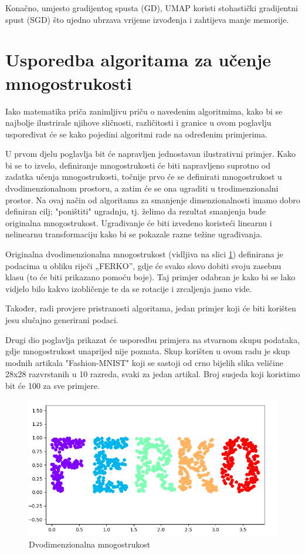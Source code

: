 \documentclass[times, utf8, diplomski]{fer}
\begin{document}
Konačno, umjesto gradijentog spusta (GD), UMAP koristi stohastički gradijentni spust (SGD) što ujedno ubrzava vrijeme izvođenja i zahtijeva manje memorije.

\section{Usporedba algoritama za učenje mnogostrukosti}

Iako matematika priča zanimljivu priču o navedenim algoritmima, kako bi se najbolje ilustrirale njihove sličnosti, različitosti i granice u ovom poglavlju uspoređivat će se kako pojedini algoritmi rade na određenim primjerima.

U prvom djelu poglavlja bit će napravljen jednostavan ilustrativni primjer. Kako bi se to izvelo, definiranje mnogostrukosti će biti napravljeno suprotno od zadatka učenja mnogostrukosti, točnije prvo će se definirati mnogostrukost u dvodimenzionalnom prostoru, a zatim će se ona ugraditi u trodimenzionalni prostor. Na ovaj način od algoritama za smanjenje dimenzionalnosti imamo dobro definiran cilj; "poništiti" ugradnju, tj. želimo da rezultat smanjenja bude originalna mnogostrukost. Ugrađivanje će biti izvedeno koristeći linearnu i nelinearnu transformaciju kako bi se pokazale razne težine ugrađivanja.

Originalna dvodimenzionalna mnogostrukost (vidljiva na slici \ref{fig:ferko}) definirana je podacima u obliku riječi „FERKO”, gdje će svako slovo dobiti svoju zasebnu klasu (to će biti prikazano pomoću boje). Taj primjer odabran je kako bi se lako vidjelo bilo kakvo izobličenje te da se rotacije i zrcaljenja jasno vide.

Također, radi provjere pristranosti algoritama, jedan primjer koji će biti korišten jesu slučajno generirani podaci.

Drugi dio poglavlja prikazat će usporedbu primjera na stvarnom skupu podataka, gdje mnogostrukost unaprijed nije poznata. Skup korišten u ovom radu je skup modnih artikala "Fashion-MNIST" koji se sastoji od crno bijelih slika veličine 28x28 razvrstanih u 10 razreda, svaki za jedan artikal. Broj susjeda koji koristimo bit će 100 za sve primjere.

\begin{figure}[htb]
    \centering
    \includegraphics[width=12cm]{resources/images/reduction/compare/ferko.png}
    \caption{Dvodimenzionalna mnogostrukost}
    \label{fig:ferko}
\end{figure}
\end{document}
